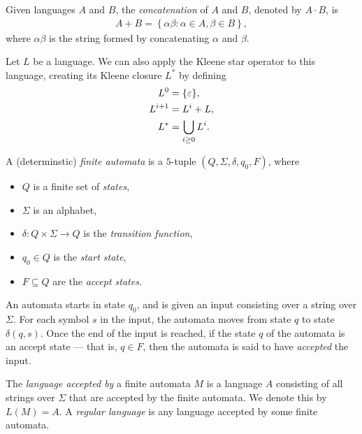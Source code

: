 \begin{defn}
    Given languages $A$ and $B$, the \emph{concatenation} of $A$ and $B$, denoted by $A \cdot B$, is
    \begin{align*}
        A + B = \left\{\alpha\beta : \alpha \in A, \beta \in B \right\},
    \end{align*}
    where $\alpha\beta$ is the string formed by concatenating $\alpha$ and $\beta$.
\end{defn}

\begin{defn}
    Let $L$ be a language. We can also apply the Kleene star operator to this language, creating its Kleene closure $L^*$ by defining
    \begin{align*}
        L^0 &= \{\varepsilon\}, \\
        L^{i+1} &= L^{i} + L, \\
        L^{*} &= \bigcup_{i \geq 0}L^{i}.
    \end{align*}
\end{defn}

\begin{defn}
    A (determinstic) \emph{finite automata} is a $5$-tuple $(Q, \Sigma, \delta, q_0, F)$, where
    \begin{itemize}
        \item $Q$ is a finite set of \emph{states},
        \item $\Sigma$ is an alphabet,
        \item $\delta: Q \times \Sigma \to Q$ is the \emph{transition function},
        \item $q_0 \in Q$ is the \emph{start state},
        \item $F \subseteq Q$ are the \emph{accept states}.
    \end{itemize}
    An automata starts in state $q_0$, and is given an input consisting over a string over $\Sigma$. For each symbol $s$ in the input, the automata moves from state $q$ to state $\delta(q, s)$. Once the end of the input is reached, if the state $q$ of the automata is an accept state --- that is, $q \in F$, then the automata is said to have \emph{accepted} the input.
\end{defn}

\begin{defn}
    The \emph{language accepted by} a finite automata $M$ is a language $A$ consisting of all strings over $\Sigma$ that are accepted by the finite automata. We denote this by $L(M) = A$. A \emph{regular language} is any language accepted by some finite automata.
\end{defn}

